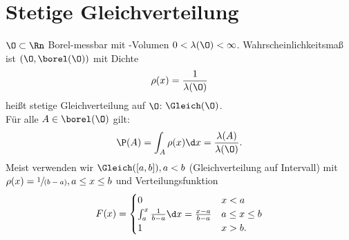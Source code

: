 ﻿\section{Stetige Gleichverteilung}

\begin{*erinnerung}
	$\O \subset \Rn$ Borel-messbar mit -Volumen $0 < \lambda(\O) < \infty$. Wahrscheinlichkeitsmaß ist $(\O, \borel(\O))$ mit Dichte
	\begin{align*}
		\rho(x) = \frac{1}{\lambda(\O)}
	\end{align*}
	heißt stetige Gleichverteilung auf $\O$: $\Gleich(\O)$.\\
	Für alle $A \in \borel(\O)$ gilt:
	\begin{align*}
		\P(A) = \int_{A} \rho(x) \d x = \frac{\lambda(A)}{\lambda(\O)}.
	\end{align*}
	Meist verwenden wir $\Gleich([a,b]), a < b$ (Gleichverteilung auf Intervall) mit $\rho(x) = \sfrac{1}{(b-a)}, a \le x \le b$ und Verteilungsfunktion
	\begin{align*}
		F(x) = 
		\begin{cases}
			0 & x < a\\
			\int_{a}^{x} \frac{1}{b-a} \d x = \frac{x-a}{b-a} & a \le x \le b\\
			1 & x >b.
		\end{cases}
	\end{align*}
\end{*erinnerung}